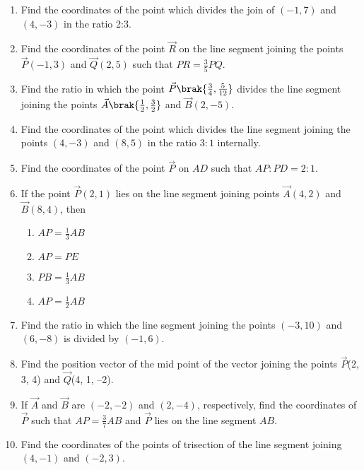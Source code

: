 \begin{enumerate}[label=\thesubsection.\arabic*,ref=\thesubsection.\theenumi]
\item Find the coordinates of the point which divides the join of $(-1,7) $ and $ (4,-3)$ in the ratio 2:3.
	\\
		\solution
	
\item Find the coordinates of the point $\vec{R}$ on the line segment joining the points $\vec{P}(-1,3)$ and $\vec{Q}(2,5)$ such that $PR=\frac{3}{5}PQ$.
\item Find the ratio in which the point $\vec{P}\brak{\frac{3}{4},\frac{5}{12}}$ divides the line segment joining the points $\vec{A}\brak{\frac{1}{2},\frac{3}{2}}$ and $ \vec{B}(2,-5)$.
\item Find the coordinates of the point which divides the line segment joining the points $(4,-3)$ and $(8,5)$ in the ratio $3:1$ internally.
\item Find the coordinates of the point $\vec{P}$ on $AD$ such that $AP : PD = 2 : 1$.
\item If the point $\vec{P} (2, 1)$ lies on the line segment joining points $\vec{A} (4, 2)$  and $ \vec{B} (8, 4)$,
then
\begin{enumerate}
	\item $AP =\frac{1}{3}{AB}$ 
\item ${AP}={PE}$
\item ${PB}=\frac{1}{3}{AB}$
\item${AP}=\frac{1}{2}{AB}$
 \end{enumerate}
\item Find the ratio in which the line segment joining the points $(-3,10)$  and  $(6,-8)$  is divided by $ (-1,6)$.
	\\
		\solution
	
\item Find the position vector of the mid point of the vector joining the points $\vec{P}$(2, 3, 4)
and $\vec{Q}$(4, 1, –2).
\\
\solution
		
\item If $\vec{A}$ and  $\vec{B}$ are $(-2,-2)$ and  $(2,-4)$, respectively, find the coordinates of $\vec{P}$ such that $AP= \frac {3}{7}AB$  and $ \vec{P}$ lies on the line segment $AB$.
	\\
		\solution
	
\item Find the coordinates of the points of trisection of the line segment joining $(4,-1)$  and  $(-2,3)$.

\end{enumerate}
